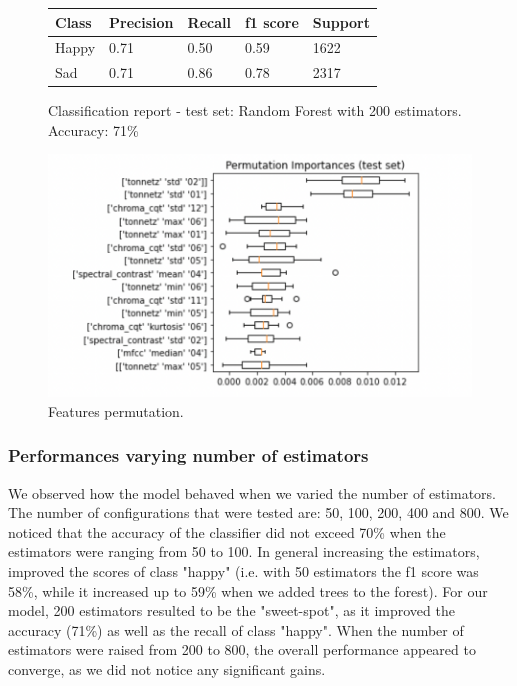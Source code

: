 \begin{figure}[!htb]
   \begin{minipage}{0.45\textwidth}
     \begin{tabular}{lllll}
        \hline
        \textbf{Class} & \textbf{Precision} & \textbf{Recall} & \textbf{f1 score} & \textbf{Support} \\ \hline
        Happy          & 0.71               & 0.50            & 0.59              & 1622             \\ \hline
        Sad            & 0.71               & 0.86            & 0.78              & 2317            
     \end{tabular}
     \caption{Classification report - test set: Random Forest with 200 estimators.\\ Accuracy: 71\%}
    \label{Classification report: Random Forest}
   \end{minipage}\hfill
   \begin{minipage}{0.47\textwidth}
     \centering
     \includegraphics[width=1\linewidth]{images/rf_permutation-importance.png}
     \caption{Features permutation.}
   \end{minipage}
\end{figure}


\subsubsection{Performances varying number of estimators}

We observed how the model behaved when we varied the number of estimators. The number of configurations that were tested are: 50, 100, 200, 400 and 800. We noticed that the accuracy of the classifier did not exceed 70\% when the estimators were ranging from 50 to 100. In general increasing the estimators, improved the scores of class "happy" (i.e. with 50 estimators the f1 score was 58\%, while it increased up to 59\% when we added trees to the forest). For our model, 200 estimators resulted to be the "sweet-spot", as it improved the accuracy (71\%) as well as the recall of class "happy". When the number of estimators were raised from 200 to 800, the overall performance appeared to converge, as we did not notice any significant gains. 



